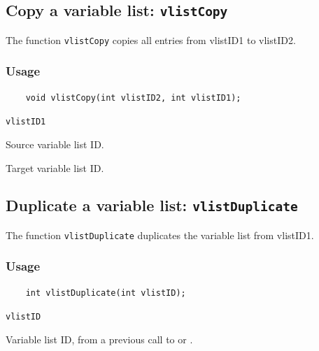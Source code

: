 \subsection{Copy a variable list: \texttt{vlistCopy}}
\label{vlistCopy}

The function {\texttt{vlistCopy}} copies all entries from vlistID1 to vlistID2.

\subsubsection*{Usage}

\begin{verbatim}
    void vlistCopy(int vlistID2, int vlistID1);
\end{verbatim}

\hspace*{4mm}\begin{minipage}[]{15cm}
\begin{deflist}{\texttt{vlistID1}\ }
\item[\texttt{vlistID1}]
Source variable list ID.
\item[\texttt{vlistID2}]
Target variable list ID.

\end{deflist}
\end{minipage}


\subsection{Duplicate a variable list: \texttt{vlistDuplicate}}
\label{vlistDuplicate}

The function {\texttt{vlistDuplicate}} duplicates the variable list from vlistID1.

\subsubsection*{Usage}

\begin{verbatim}
    int vlistDuplicate(int vlistID);
\end{verbatim}

\hspace*{4mm}\begin{minipage}[]{15cm}
\begin{deflist}{\texttt{vlistID}\ }
\item[\texttt{vlistID}]
Variable list ID, from a previous call to {} or {}.

\end{deflist}
\end{minipage}

